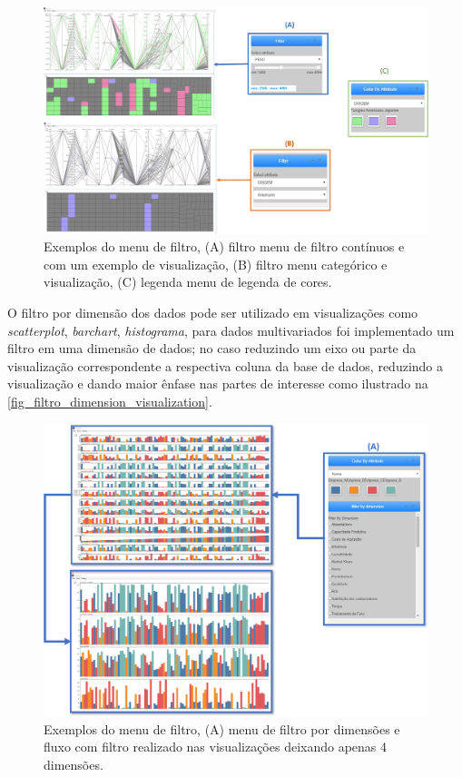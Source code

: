 \documentclass[
	12pt,				%
	openright,			%
	oneside,			%
	a4paper,			%
	english,			%
	brazil				%
	]{abntex2}
\begin{document}
\begin{figure}[h]
	\caption{\label{fig_filtro_visualization} Exemplos do menu de filtro, (A) filtro menu de filtro contínuos e com um exemplo de visualização, (B) filtro menu categórico e visualização, (C) legenda menu de legenda de cores.
}
	\begin{center}
	    \includegraphics[width=\textwidth]{figures/filtro.jpg}
	\end{center}
\end{figure}

O filtro por dimensão dos dados pode ser utilizado em visualizações como \textit{scatterplot}, \textit{barchart}, \textit{histograma}, para dados multivariados foi implementado um filtro em uma dimensão de dados; no caso reduzindo um eixo ou parte da visualização correspondente a respectiva coluna da base de dados, reduzindo a visualização e dando maior ênfase nas partes de interesse como ilustrado na \autoref{fig_filtro_dimension_visualization}.

\begin{figure}[h]
	\caption{\label{fig_filtro_dimension_visualization} Exemplos do menu de filtro, (A) menu de filtro por dimensões e fluxo com filtro realizado nas visualizações deixando apenas 4 dimensões.
}
	\begin{center}
	    \includegraphics[width=\textwidth]{figures/filtro_dimensao.png}
	\end{center}
\end{figure}
\end{document}
